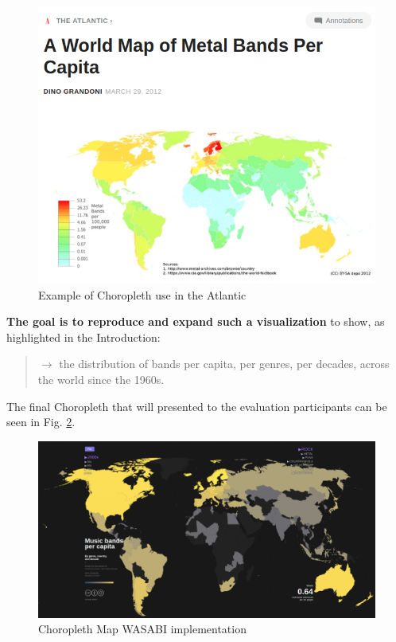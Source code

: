 \documentclass[twocolumn, letterpaper,13pt]{scrartcl}
\begin{document}
    \begin{figure}	\includegraphics[width=0.98\linewidth]{atlantic_article.png}
    \caption{Example of Choropleth use in the Atlantic\label{fig:a}}
    \end{figure}
    
    \textbf{The goal is to reproduce and expand such a visualization} to show, as highlighted in the Introduction:
    \begin{quote}
        $\rightarrow$ the distribution of bands per capita, per genres, per decades, across the world since the 1960s.
    \end{quote}
    \newline The final Choropleth that will presented to the evaluation participants can be seen in Fig. \ref{fig:b}.
    
    \begin{figure}	\includegraphics[width=0.98\linewidth]{map.png}
    \caption{Choropleth Map WASABI implementation\label{fig:b}}
    \end{figure}
    
\end{document}
